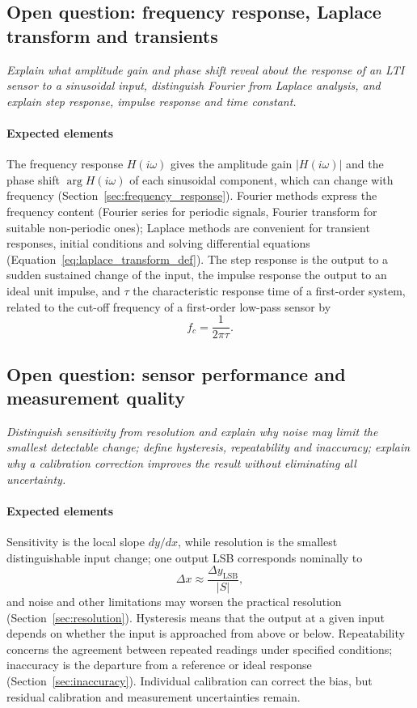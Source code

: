 \subsection{Open question: frequency response, Laplace transform and transients}

\emph{Explain what amplitude gain and phase shift reveal about the response of an LTI sensor to a sinusoidal input, distinguish Fourier from Laplace analysis, and explain step response, impulse response and time constant.}

\paragraph{Expected elements} The frequency response $H(i\omega)$ gives the amplitude gain $|H(i\omega)|$ and the phase shift $\arg H(i\omega)$ of each sinusoidal component, which can change with frequency (Section~\ref{sec:frequency_response}). Fourier methods express the frequency content (Fourier series for periodic signals, Fourier transform for suitable non-periodic ones); Laplace methods are convenient for transient responses, initial conditions and solving differential equations (Equation~\eqref{eq:laplace_transform_def}). The step response is the output to a sudden sustained change of the input, the impulse response the output to an ideal unit impulse, and $\tau$ the characteristic response time of a first-order system, related to the cut-off frequency of a first-order low-pass sensor by
\begin{equation*}
f_c = \frac{1}{2\pi\tau}.
\end{equation*}

\subsection{Open question: sensor performance and measurement quality}

\emph{Distinguish sensitivity from resolution and explain why noise may limit the smallest detectable change; define hysteresis, repeatability and inaccuracy; explain why a calibration correction improves the result without eliminating all uncertainty.}

\paragraph{Expected elements} Sensitivity is the local slope $dy/dx$, while resolution is the smallest distinguishable input change; one output LSB corresponds nominally to
\begin{equation*}
\Delta x \approx \frac{\Delta y_{\text{LSB}}}{|S|},
\end{equation*}
and noise and other limitations may worsen the practical resolution (Section~\ref{sec:resolution}). Hysteresis means that the output at a given input depends on whether the input is approached from above or below. Repeatability concerns the agreement between repeated readings under specified conditions; inaccuracy is the departure from a reference or ideal response (Section~\ref{sec:inaccuracy}). Individual calibration can correct the bias, but residual calibration and measurement uncertainties remain.


